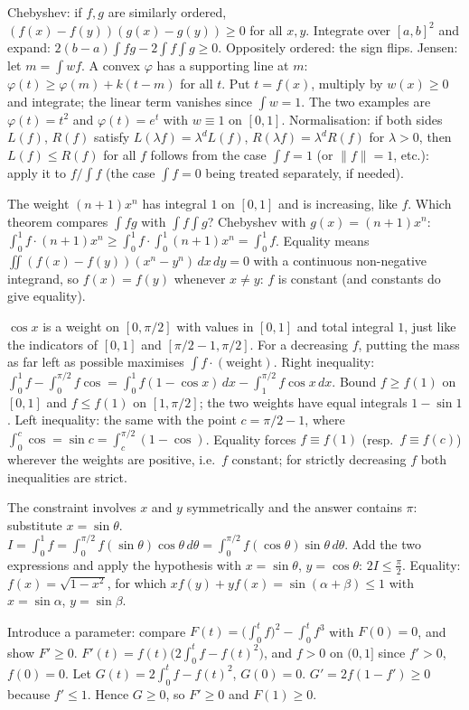 \documentclass[11pt,a4paper]{article}
\begin{document}

 Chebyshev: if $f,g$ are similarly ordered, $(f(x)-f(y))(g(x)-g(y))\ge0$ for all $x,y$. Integrate over $[a,b]^2$ and expand: $2(b-a)\int fg-2\int f\int g\ge0$. Oppositely ordered: the sign flips.
 Jensen: let $m=\int wf$. A convex $\varphi$ has a supporting line at $m$: $\varphi(t)\ge\varphi(m)+k(t-m)$ for all $t$. Put $t=f(x)$, multiply by $w(x)\ge0$ and integrate; the linear term vanishes since $\int w=1$. The two examples are $\varphi(t)=t^2$ and $\varphi(t)=e^t$ with $w\equiv1$ on $[0,1]$.
 Normalisation: if both sides $L(f)$, $R(f)$ satisfy $L(\lambda f)=\lambda^dL(f)$, $R(\lambda f)=\lambda^dR(f)$ for $\lambda>0$, then $L(f)\le R(f)$ for all $f$ follows from the case $\int f=1$ (or $\|f\|=1$, etc.): apply it to $f/\int f$ (the case $\int f=0$ being treated separately, if needed).

 The weight $(n+1)x^n$ has integral $1$ on $[0,1]$ and is increasing, like $f$. Which theorem compares $\int fg$ with $\int f\int g$?
 Chebyshev with $g(x)=(n+1)x^n$: $\int_0^1f\cdot(n+1)x^n\ge\int_0^1f\cdot\int_0^1(n+1)x^n=\int_0^1f$.
 Equality means $\iint(f(x)-f(y))(x^n-y^n)\,dx\,dy=0$ with a continuous non-negative integrand, so $f(x)=f(y)$ whenever $x\ne y$: $f$ is constant (and constants do give equality).

 $\cos x$ is a weight on $[0,\pi/2]$ with values in $[0,1]$ and total integral $1$, just like the indicators of $[0,1]$ and $[\pi/2-1,\pi/2]$. For a decreasing $f$, putting the mass as far left as possible maximises $\int f\cdot(\text{weight})$.
 Right inequality: $\int_0^1f-\int_0^{\pi/2}f\cos=\int_0^1f(1-\cos x)\,dx-\int_1^{\pi/2}f\cos x\,dx$. Bound $f\ge f(1)$ on $[0,1]$ and $f\le f(1)$ on $[1,\pi/2]$; the two weights have equal integrals $1-\sin1$.
 Left inequality: the same with the point $c=\pi/2-1$, where $\int_0^c\cos=\sin c=\int_c^{\pi/2}(1-\cos)$. Equality forces $f\equiv f(1)$ (resp.\ $f\equiv f(c)$) wherever the weights are positive, i.e.\ $f$ constant; for strictly decreasing $f$ both inequalities are strict.

 The constraint involves $x$ and $y$ symmetrically and the answer contains $\pi$: substitute $x=\sin\theta$.
 $I=\int_0^1f=\int_0^{\pi/2}f(\sin\theta)\cos\theta\,d\theta=\int_0^{\pi/2}f(\cos\theta)\sin\theta\,d\theta$. Add the two expressions and apply the hypothesis with $x=\sin\theta$, $y=\cos\theta$: $2I\le\frac\pi2$.
 Equality: $f(x)=\sqrt{1-x^2}$, for which $xf(y)+yf(x)=\sin(\alpha+\beta)\le1$ with $x=\sin\alpha$, $y=\sin\beta$.

 Introduce a parameter: compare $F(t)=\big(\int_0^tf\big)^2-\int_0^tf^3$ with $F(0)=0$, and show $F'\ge0$.
 $F'(t)=f(t)\big(2\int_0^tf-f(t)^2\big)$, and $f>0$ on $(0,1]$ since $f'>0$, $f(0)=0$. Let $G(t)=2\int_0^tf-f(t)^2$, $G(0)=0$.
 $G'=2f(1-f')\ge0$ because $f'\le1$. Hence $G\ge0$, so $F'\ge0$ and $F(1)\ge0$.
\end{document}
